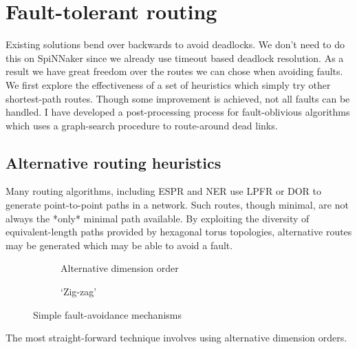 	\section{Fault-tolerant routing}
		
		Existing solutions bend over backwards to avoid deadlocks. We don't need to
		do this on SpiNNaker since we already use timeout based deadlock
		resolution. As a result we have great freedom over the routes we can chose
		when avoiding faults. We first explore the effectiveness of a set of
		heuristics which simply try other shortest-path routes. Though some
		improvement is achieved, not all faults can be handled. I have developed a
		post-processing process for fault-oblivious algorithms which uses a
		graph-search procedure to route-around dead links.
		
		\subsection{Alternative routing heuristics}
			
			Many routing algorithms, including ESPR and NER use LPFR or DOR to
			generate point-to-point paths in a network. Such routes, though minimal,
			are not always the *only* minimal path available. By exploiting the
			diversity of equivalent-length paths provided by hexagonal torus
			topologies, alternative routes may be generated which may be able to
			avoid a fault.
			
			\begin{figure}
				\center
				\begin{subfigure}{0.45\linewidth}
					\center
					
					\caption{Alternative dimension order}
					\label{fig:simple-fault-avoidance-order}
				\end{subfigure}
				\begin{subfigure}{0.45\linewidth}
					\center
					
					\caption{`Zig-zag'}
					\label{fig:simple-fault-avoidance-zigzag}
				\end{subfigure}
				
				\caption{Simple fault-avoidance mechanisms}
				\label{fig:simple-fault-avoidance}
			\end{figure}
			
			The most straight-forward technique involves using alternative dimension
			orders.
			
